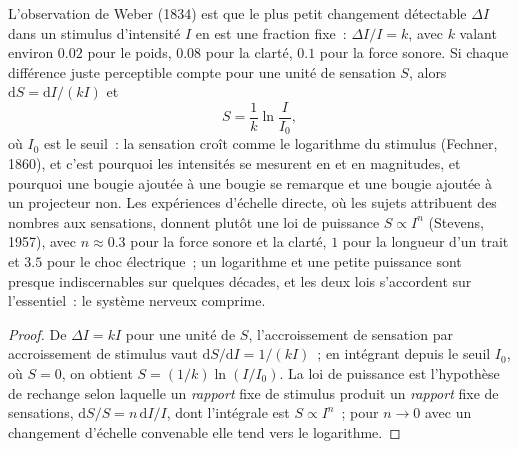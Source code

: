 \begin{theorem}\label{thm:b3:sensory-systems:weber}
L'observation de Weber (1834) est que le plus petit changement
détectable $\Delta I$ dans un stimulus d'intensité $I$ en est une
fraction fixe~: $\Delta I/I = k$, avec $k$ valant environ $0.02$ pour le
poids, $0.08$ pour la clarté, $0.1$ pour la force sonore. Si chaque
différence juste perceptible compte pour une unité de sensation $S$,
alors $\mathrm{d}S = \mathrm{d}I/
(kI)$ et
\[
S = \frac{1}{k}\ln\frac{I}{I_{0}} ,
\]
où $I_{0}$ est le seuil~: la sensation croît comme le logarithme du
stimulus (Fechner, 1860), et c'est pourquoi les intensités se mesurent
en  et en magnitudes, et pourquoi une bougie ajoutée à une
bougie se remarque et une bougie ajoutée à un projecteur non. Les
expériences d'échelle directe, où les sujets attribuent des nombres aux
sensations, donnent plutôt une loi de puissance $S \propto I^{n}$
(Stevens, 1957), avec $n \approx
0.3$ pour la force sonore et la clarté, $1$ pour la longueur d'un trait
et $3.5$ pour le choc électrique~; un logarithme et une petite puissance
sont presque indiscernables sur quelques décades, et les deux lois
s'accordent sur l'essentiel~: le système nerveux comprime.
\end{theorem}
\begin{proof}
De $\Delta I = kI$ pour une unité de $S$, l'accroissement de sensation
par accroissement de stimulus vaut $\mathrm{d}S/\mathrm{d}I = 1/(kI)$~;
en intégrant depuis le seuil $I_{0}$, où $S = 0$, on obtient $S = (1/k)
\ln(I/I_{0})$. La loi de puissance est l'hypothèse de rechange selon
laquelle un \emph{rapport} fixe de stimulus produit un \emph{rapport}
fixe de sensations, $\mathrm{d}S/S = n\,\mathrm{d}I/I$, dont l'intégrale
est $S \propto I^{n}$~; pour $n \to 0$ avec un changement d'échelle
convenable elle tend vers le logarithme.
\end{proof}

